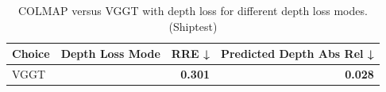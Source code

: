 \begin{table}[H]
\caption{COLMAP versus VGGT with depth loss for different depth loss modes. (Shiptest)}
\label{tab:05_depth_loss_mode_shiptest}
\begin{tabular}{llrr}
\toprule
Choice & Depth Loss Mode & RRE ↓ & Predicted Depth Abs Rel ↓ \\
\midrule
VGGT &  & \textbf{0.301} & \textbf{0.028} \\
\bottomrule
\end{tabular}
\end{table}
